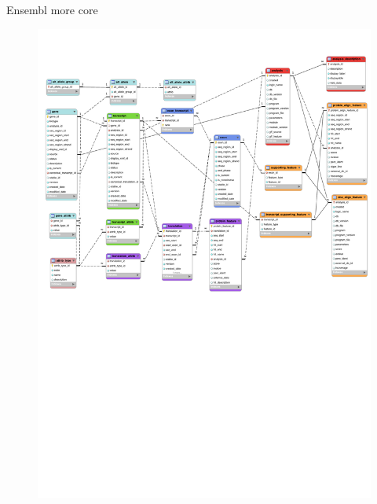 \documentclass[pdf]{beamer}
\begin{document}
\begin{frame}{Ensembl more core}
  \begin{figure}[ht]
    \includegraphics[width=\textwidth]{images/fundamental_tables_core_crop2}
  \end{figure}
\end{frame}
\end{document}
